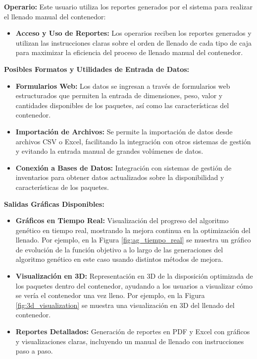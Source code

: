 \documentclass[9pt,a4paper]{rho}
\begin{document}
\textbf{Operario:} Este usuario utiliza los reportes generados por el sistema para realizar el llenado manual del contenedor:
\begin{itemize}
    \item \textbf{Acceso y Uso de Reportes:} Los operarios reciben los reportes generados y utilizan las instrucciones claras sobre el orden de llenado de cada tipo de caja para maximizar la eficiencia del proceso de llenado manual del contenedor.
\end{itemize}

\textbf{Posibles Formatos y Utilidades de Entrada de Datos:}
\begin{itemize}
    \item \textbf{Formularios Web:} Los datos se ingresan a través de formularios web estructurados que permiten la entrada de dimensiones, peso, valor y cantidades disponibles de los paquetes, así como las características del contenedor.
    \item \textbf{Importación de Archivos:} Se permite la importación de datos desde archivos CSV o Excel, facilitando la integración con otros sistemas de gestión y evitando la entrada manual de grandes volúmenes de datos.
    \item \textbf{Conexión a Bases de Datos:} Integración con sistemas de gestión de inventarios para obtener datos actualizados sobre la disponibilidad y características de los paquetes.
\end{itemize}

\textbf{Salidas Gráficas Disponibles:}
\begin{itemize}
    \item \textbf{Gráficos en Tiempo Real:} Visualización del progreso del algoritmo genético en tiempo real, mostrando la mejora continua en la optimización del llenado. Por ejemplo, en la Figura \ref{fig:ag_tiempo_real} se muestra un gráfico de evolución de la función objetivo a lo largo de las generaciones del algoritmo genético en este caso usando distintos métodos de mejora.
    \item \textbf{Visualización en 3D:} Representación en 3D de la disposición optimizada de los paquetes dentro del contenedor, ayudando a los usuarios a visualizar cómo se vería el contenedor una vez lleno. Por ejemplo, en la Figura \ref{fig:3d_visualization} se muestra una visualización en 3D del llenado del contenedor.
    \item \textbf{Reportes Detallados:} Generación de reportes en PDF y Excel con gráficos y visualizaciones claras, incluyendo un manual de llenado con instrucciones paso a paso.
\end{itemize}
\end{document}
